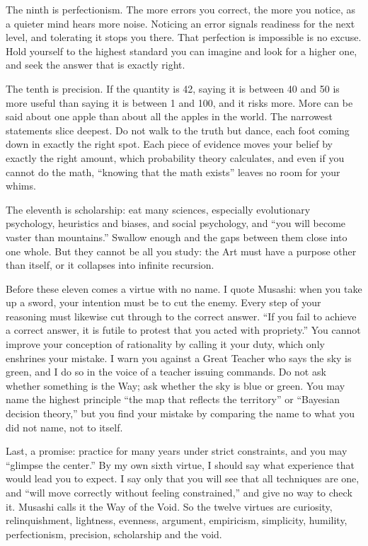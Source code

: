 The ninth is perfectionism. The more errors you correct, the more you notice, as a quieter mind hears more noise. Noticing an error signals readiness for the next level, and tolerating it stops you there. That perfection is impossible is no excuse. Hold yourself to the highest standard you can imagine and look for a higher one, and seek the answer that is exactly right.

The tenth is precision. If the quantity is 42, saying it is between 40 and 50 is more useful than saying it is between 1 and 100, and it risks more. More can be said about one apple than about all the apples in the world. The narrowest statements slice deepest. Do not walk to the truth but dance, each foot coming down in exactly the right spot. Each piece of evidence moves your belief by exactly the right amount, which probability theory calculates, and even if you cannot do the math, ``knowing that the math exists'' leaves no room for your whims. 

The eleventh is scholarship: eat many sciences, especially evolutionary psychology, heuristics and biases, and social psychology, and ``you will become vaster than mountains.'' Swallow enough and the gaps between them close into one whole. But they cannot be all you study: the Art must have a purpose other than itself, or it collapses into infinite recursion. 

Before these eleven comes a virtue with no name. I quote Musashi: when you take up a sword, your intention must be to cut the enemy. Every step of your reasoning must likewise cut through to the correct answer. ``If you fail to achieve a correct answer, it is futile to protest that you acted with propriety.'' You cannot improve your conception of rationality by calling it your duty, which only enshrines your mistake. I warn you against a Great Teacher who says the sky is green, and I do so in the voice of a teacher issuing commands. Do not ask whether something is the Way; ask whether the sky is blue or green. You may name the highest principle ``the map that reflects the territory'' or ``Bayesian decision theory,'' but you find your mistake by comparing the name to what you did not name, not to itself.

Last, a promise: practice for many years under strict constraints, and you may ``glimpse the center.'' By my own sixth virtue, I should say what experience that would lead you to expect. I say only that you will see that all techniques are one, and ``will move correctly without feeling constrained,'' and give no way to check it. Musashi calls it the Way of the Void. So the twelve virtues are curiosity, relinquishment, lightness, evenness, argument, empiricism, simplicity, humility, perfectionism, precision, scholarship and the void.
